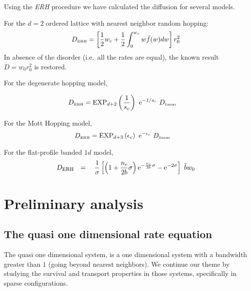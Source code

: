 Using the \emph{ERH} procedure we have calculated the diffusion for several models.


For the $d=2$ ordered lattice with nearest neighbor random hopping:
%
\begin{align}
D_{\mbox{\tiny ERH}} =  \left[\frac{1}{2}w_c + \frac{1}{2}\int_0^{w_c} w\tilde{f}(w) dw\right]r_0^2
\end{align}
%
In absence of the disorder (i.e.\ all the rates are equal),
the known result $D = w_0r_0^2$ is restored.


For the degenerate hopping model, 

\begin{align}
D_{\tbox{ERH}} &=  \mathrm{EXP}_{d{+}2}\left(\frac{1}{s_c}\right)  \  \eexp{-1/s_c}  \ D_{\tbox{linear}}
\end{align}
%


For the Mott Hopping model,
%
\begin{align}
D_{\tbox{ERH}} &=\mathrm{EXP}_{d{+}3}\left(\epsilon_c\right)  \  \eexp{-\epsilon_c}  \ D_{\tbox{linear}}
\end{align}
%


For the flat-profile banded $1d$ model,
\begin{align}
D_{\text{ERH}} \ \ = \ \ 
\ \frac{1}{\sigma}\left[ 
\left(1+\frac{n_c}{2b}\sigma\right)\eexp{-\frac{n_c}{2b}\sigma} - \eexp{-2\sigma}
\right] \ \tilde{b} w_0
\end{align}

\chapter{Preliminary analysis}





\section{The quasi one dimensional rate equation}

The quasi one dimensional system, is a one dimensional system
with a bandwidth greater than $1$ (going beyond nearest neighbors). 
We continue our theme by studying the survival and transport properties 
in those systems, specifically in sparse configurations.


